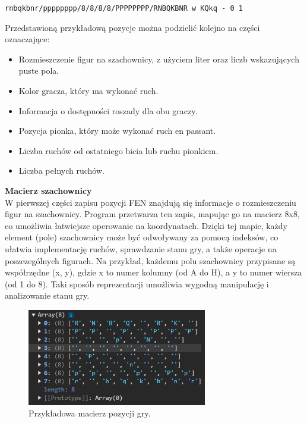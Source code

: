 \documentclass[12pt,a4paper]{article}
\begin{document}
\begin{center}
    \texttt{rnbqkbnr/pppppppp/8/8/8/8/PPPPPPPP/RNBQKBNR w KQkq - 0 1}
\end{center}

\noindent
Przedstawioną przykładową pozycje można podzielić kolejno na części oznaczające:

\begin{itemize}
    \item Rozmieszczenie figur na szachownicy, z użyciem liter oraz liczb wskazujących puste pola.
    \item Kolor gracza, który ma wykonać ruch.
    \item Informacja o dostępności roszady dla obu graczy.
    \item Pozycja pionka, który może wykonać ruch en passant.
    \item Liczba ruchów od ostatniego bicia lub ruchu pionkiem.
    \item Liczba pełnych ruchów.
\end{itemize}

\noindent \textbf{Macierz szachownicy}\\
W pierwszej części zapisu pozycji FEN znajdują się informacje o rozmieszczeniu figur na szachownicy. Program przetwarza ten zapis, mapując go na macierz 8x8, co umożliwia łatwiejsze operowanie na koordynatach. Dzięki tej mapie, każdy element (pole) szachownicy może być odwoływany za pomocą indeksów, co ułatwia implementację ruchów, sprawdzanie stanu gry, a także operacje na poszczególnych figurach. Na przykład, każdemu polu szachownicy przypisane są współrzędne (x, y), gdzie x to numer kolumny (od A do H), a y to numer wiersza (od 1 do 8). Taki sposób reprezentacji umożliwia wygodną manipulację i analizowanie stanu gry.

\begin{figure}[h!]
    \centering
    \includegraphics[width=0.7\textwidth]{images/ex_matrix.png}
    \caption{Przykładowa macierz pozycji gry.}
\end{figure}
\end{document}
